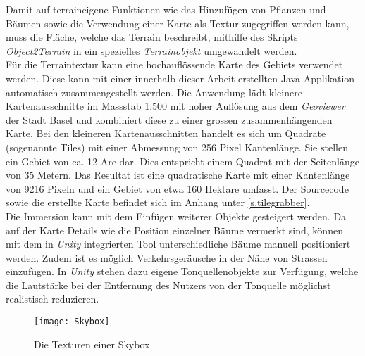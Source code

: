 Damit auf terraineigene Funktionen wie das Hinzufügen von Pflanzen und Bäumen sowie die Verwendung einer Karte als Textur zugegriffen werden kann, muss die Fläche, welche das Terrain beschreibt, mithilfe des Skripts \textit{Object2Terrain}\cite{website:terrain} in ein spezielles \textit{Terrainobjekt} umgewandelt werden.\\[6pt]
Für die Terraintextur kann eine hochauflössende Karte des Gebiets verwendet werden. Diese kann mit einer innerhalb dieser Arbeit erstellten Java-Applikation automatisch zusammengestellt werden. Die Anwendung lädt kleinere Kartenausschnitte im Massstab 1:500 mit hoher Auflösung aus dem \textit{Geoviewer} der Stadt Basel und kombiniert diese zu einer grossen zusammenhängenden Karte. Bei den kleineren Kartenausschnitten handelt es sich um Quadrate (sogenannte Tiles) mit einer Abmessung von 256 Pixel Kantenlänge. Sie stellen ein Gebiet von ca. 12 Are dar. Dies entspricht einem Quadrat mit der Seitenlänge von 35 Metern. Das Resultat ist eine quadratische Karte mit einer Kantenlänge von 9216 Pixeln und ein Gebiet von etwa 160 Hektare umfasst. Der Sourcecode sowie die erstellte Karte befindet sich im Anhang unter \ref{s.tilegrabber}.\\[6pt]
Die Immersion kann mit dem Einfügen weiterer Objekte gesteigert werden. Da auf der Karte Details wie die Position einzelner Bäume vermerkt sind, können mit dem in \textit{Unity} integrierten Tool unterschiedliche Bäume manuell positioniert werden. Zudem ist es möglich Verkehrsgeräusche in der Nähe von Strassen einzufügen. In \textit{Unity} stehen dazu eigene Tonquellenobjekte zur Verfügung, welche die Lautstärke bei der Entfernung des Nutzers von der Tonquelle möglichst realistisch reduzieren.\\[6pt]
\vspace{-12pt}
\begin{wrapfigure}{r}{0.35\textwidth}
	\vspace{-30pt}
	\begin{center}
		\texttt{[image: Skybox]}
	\end{center}
	\vspace{-15pt}
	\captionsetup{width=0.28\textwidth}
	\caption{Die Texturen einer Skybox}
	\vspace{-20pt}
\end{wrapfigure}
